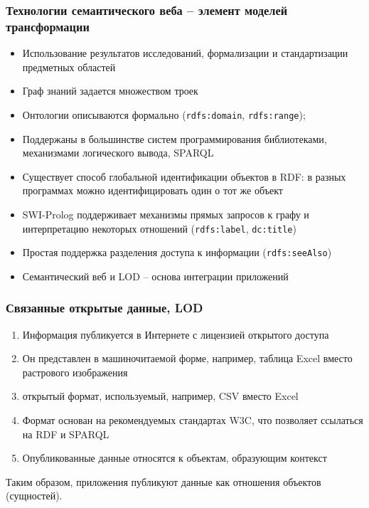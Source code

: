 \documentclass[handout]{beamer}
\begin{document}
\begin{frame}[fragile]
  \frametitle{Технологии семантического веба -- элемент моделей трансформации}
  \begin{itemize}
  \item Использование результатов исследований, формализации и стандартизации предметных областей
  \item Граф знаний задается множеством троек
  \item Онтологии описываются формально (\verb|rdfs:domain|, \verb|rdfs:range|);
  \item Поддержаны в большинстве систем программирования библиотеками, механизмами логического вывода, SPARQL
  \item Существует способ глобальной идентификации объектов в RDF: в разных программах можно идентифицировать один о тот же объект
  \item SWI-Prolog поддерживает механизмы прямых запросов к графу и интерпретацию некоторых отношений (\verb|rdfs:label|, \verb|dc:title|)
  \item Простая поддержка разделения доступа к информации (\verb|rdfs:seeAlso|)
  \item Семантический веб и LOD -- основа интеграции приложений
  \end{itemize}
\end{frame}

\begin{frame}
\frametitle{Связанные открытые данные, LOD}
\begin{enumerate}
\item  Информация публикуется в Интернете с лицензией открытого доступа
\item  Он представлен в машиночитаемой форме, например, таблица Excel вместо растрового изображения
\item  открытый формат, используемый, например, CSV вместо Excel
\item  Формат основан на рекомендуемых стандартах W3C, что позволяет ссылаться на RDF и SPARQL
\item Опубликованные данные относятся к объектам, образующим контекст
\end{enumerate}
Таким образом, приложения публикуют данные как отношения объектов (сущностей).
\end{frame}
\end{document}
